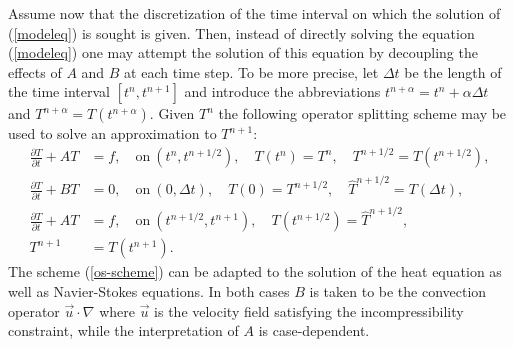 \begin{versiona}
Assume now that the discretization of the time interval on which the solution 
of (\ref{modeleq}) is sought is given. Then,
instead of directly solving the equation (\ref{modeleq}) one 
may attempt the solution of this equation by decoupling the effects of $A$ and 
$B$ at each time step. To be more precise, let $\Delta t$ be the length of the
time interval $[t^n,t^{n+1}]$ and introduce the abbreviations 
$t^{n+\alpha}=t^n + \alpha\Delta t$ and $T^{n+\alpha}=T(t^{n+\alpha})$. 
Given $T^n$ the following operator splitting scheme may be used to solve
an approximation to $T^{n+1}$:    
\begin{equation}\label{os-scheme}
\begin{split}
\frac{\partial T}{\partial t}+A T &= f,\quad \mathrm{on}\ (t^n,t^{n+1/2}),
\quad T(t^n)=T^n, \quad T^{n+1/2}=T(t^{n+1/2}), \\
\frac{\partial T}{\partial t}+B T &= 0,\quad \mathrm{on}\ (0,\Delta t),
\quad T(0)=T^{n+1/2}, \quad \hat{T}^{n+1/2}=T(\Delta t),  \\ 
\frac{\partial T}{\partial t}+A T &= f,\quad \mathrm{on}\ (t^{n+1/2},t^{n+1}),
\quad T(t^{n+1/2})=\hat{T}^{n+1/2},\\
T^{n+1}&=T(t^{n+1}).
\end{split}
\end{equation}
The scheme (\ref{os-scheme}) can be adapted to the solution of the heat 
equation as well as Navier-Stokes equations. In both cases $B$ is taken
to be the convection operator $\vec u \cdot \nabla$ where $\vec u$  
is the velocity field satisfying the incompressibility constraint, while
the interpretation of $A$ is case-dependent. 


\end{versiona}
